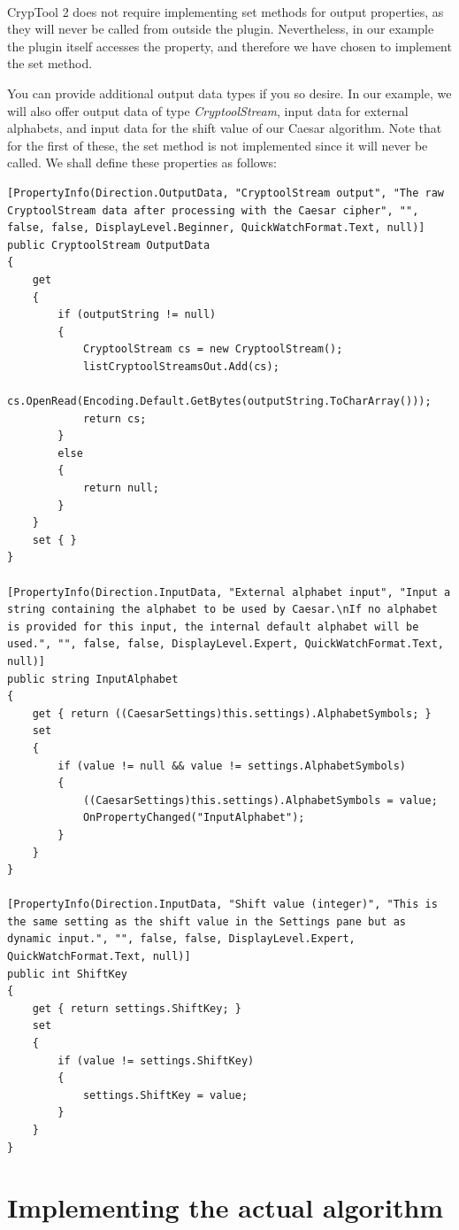 \ \\
\indent CrypTool 2 does not require implementing set methods for output properties, as they will never be called from outside the plugin. Nevertheless, in our example the plugin itself accesses the property, and therefore we have chosen to implement the set method.

You can provide additional output data types if you so desire. In our example, we will also offer output data of type \textit{CryptoolStream}, input data for external alphabets, and input data for the shift value of our Caesar algorithm. Note that for the first of these, the set method is not implemented since it will never be called. We shall define these properties as follows:

\begin{lstlisting}
[PropertyInfo(Direction.OutputData, "CryptoolStream output", "The raw CryptoolStream data after processing with the Caesar cipher", "", false, false, DisplayLevel.Beginner, QuickWatchFormat.Text, null)]
public CryptoolStream OutputData
{
	get
	{
		if (outputString != null)
		{
			CryptoolStream cs = new CryptoolStream();
			listCryptoolStreamsOut.Add(cs);
			cs.OpenRead(Encoding.Default.GetBytes(outputString.ToCharArray()));
			return cs;
		}
		else
		{
			return null;
		}
	}
	set { }
}

[PropertyInfo(Direction.InputData, "External alphabet input", "Input a string containing the alphabet to be used by Caesar.\nIf no alphabet is provided for this input, the internal default alphabet will be used.", "", false, false, DisplayLevel.Expert, QuickWatchFormat.Text, null)]
public string InputAlphabet
{
	get { return ((CaesarSettings)this.settings).AlphabetSymbols; }
	set
	{
		if (value != null && value != settings.AlphabetSymbols)
		{
			((CaesarSettings)this.settings).AlphabetSymbols = value;
			OnPropertyChanged("InputAlphabet");
		}
	}
}

[PropertyInfo(Direction.InputData, "Shift value (integer)", "This is the same setting as the shift value in the Settings pane but as dynamic input.", "", false, false, DisplayLevel.Expert, QuickWatchFormat.Text, null)]
public int ShiftKey
{
	get { return settings.ShiftKey; }
	set
	{
		if (value != settings.ShiftKey)
		{
			settings.ShiftKey = value;
		}
	}
}
\end{lstlisting}

\section{Implementing the actual algorithm}

